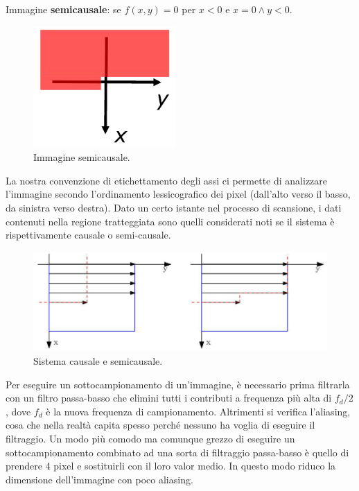 \documentclass[a4paper,11pt]{article}
\begin{document}
Immagine \textbf{semicausale}: se $f(x, y) = 0$ per $x < 0$ e $x = 0 \land y < 0$.

\renewcommand{\thefigure}{5.2}
\begin{figure}[!h]
  \centering
    \includegraphics[scale=0.4]{images/5/semicausal_img.png}
    \caption{Immagine semicausale.}
\end{figure}

La nostra convenzione di etichettamento degli assi ci permette di analizzare l'immagine secondo l'ordinamento lessicografico dei pixel
(dall'alto verso il basso, da sinistra verso destra). Dato un certo istante nel processo di scansione, i dati contenuti nella regione tratteggiata
sono quelli considerati noti se il sistema è rispettivamente causale o semi-causale.

\renewcommand{\thefigure}{5.3}
\begin{figure}[!h]
  \centering
    \includegraphics[scale=0.4]{images/5/systems.png}
    \caption{Sistema causale e semicausale.}
\end{figure}

Per eseguire un sottocampionamento di un'immagine, è necessario prima filtrarla con un filtro passa-basso che elimini tutti i contributi a frequenza più alta di
$f_d/2$, dove $f_d$ è la nuova frequenza di campionamento. Altrimenti si verifica l'aliasing, cosa che nella realtà capita spesso perché
nessuno ha voglia di eseguire il filtraggio. Un modo più comodo ma comunque grezzo di eseguire un sottocampionamento combinato ad una sorta di filtraggio passa-basso
è quello di prendere 4 pixel e sostituirli con il loro valor medio. In questo modo riduco la dimensione dell'immagine con poco aliasing.
\end{document}
